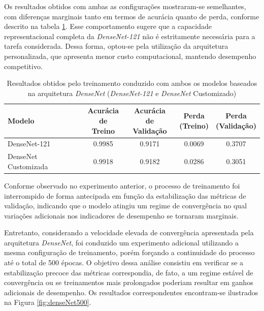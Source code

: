 Os resultados obtidos com ambas as configurações mostraram-se semelhantes, com diferenças marginais tanto em termos de acurácia quanto de perda, conforme descrito na tabela \ref{tab:densenet_variants_results}. Esse comportamento sugere que a capacidade representacional completa da \textit{DenseNet-121} não é estritamente necessária para a tarefa considerada. Dessa forma, optou-se pela utilização da arquitetura personalizada, que apresenta menor custo computacional, mantendo desempenho competitivo.

\begin{table}[h]
	\centering
	\caption{Resultados obtidos pelo treinamento conduzido com ambos os modelos baseados na arquitetura \textit{\textit{DenseNet}} (\textit{DenseNet-121} e \textit{DenseNet} Customizado)}
	\label{tab:densenet_variants_results}
	\setlength{\tabcolsep}{3pt}
	
	\begin{tabular}{l|c|c|c|c}
		\toprule
		\textbf{Modelo} &
		\makecell{\textbf{Acurácia}\\ \textbf{de Treino}} &
		\makecell{\textbf{Acurácia}\\ \textbf{de Validação}} &
		\makecell{\textbf{Perda}\\ \textbf{(Treino)}} &
		\makecell{\textbf{Perda}\\ \textbf{(Validação)}} \\
		\midrule
		
		DenseNet-121 & 0.9985 & 0.9171 & 0.0069 & 0.3707 \\
		DenseNet Customizada & 0.9918 & 0.9182 & 0.0286 & 0.3051 \\

		\bottomrule
	\end{tabular}
\end{table}

Conforme observado no experimento anterior, o processo de treinamento foi interrompido de forma antecipada em função da estabilização das métricas de validação, indicando que o modelo atingiu um regime de convergência no qual variações adicionais nos indicadores de desempenho se tornaram marginais. 

Entretanto, considerando a velocidade elevada de convergência apresentada pela arquitetura \textit{DenseNet}, foi conduzido um experimento adicional utilizando a mesma configuração de treinamento, porém forçando a continuidade do processo até o total de 500 épocas. O objetivo dessa análise consistiu em verificar se a estabilização precoce das métricas correspondia, de fato, a um regime estável de convergência ou se treinamentos mais prolongados poderiam resultar em ganhos adicionais de desempenho. Os resultados correspondentes encontram-se ilustrados na Figura \ref{fig:denseNet500}.

